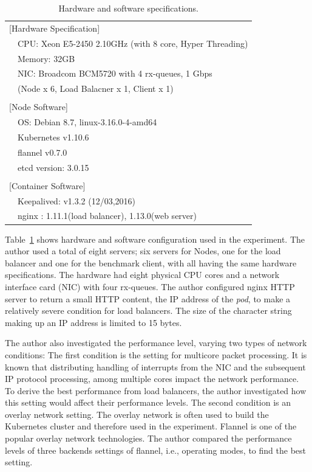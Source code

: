 {
\setlength{\tabcolsep}{3em}
\renewcommand{\arraystretch}{1.1}

\begin{table}[h]
  \centering
  \begin{tabular}{ll}
    \hline 
    \multicolumn{2}{l}{[Hardware Specification]}   \\
    & CPU: Xeon E5-2450 2.10GHz (with 8 core, Hyper Threading) \\
    & Memory: 32GB \\
    & NIC: Broadcom BCM5720 with 4 rx-queues, 1 Gbps \\
    & (Node x 6, Load Balacner x 1, Client x 1) \\
    & \\
    \multicolumn{2}{l}{[Node Software]}  \\
    & OS: Debian 8.7, linux-3.16.0-4-amd64 \\
    & Kubernetes v1.10.6 \\
    & flannel v0.7.0 \\
    & etcd version: 3.0.15 \\
    & \\
    \multicolumn{2}{l}{[Container Software]}   \\
    & Keepalived: v1.3.2 (12/03,2016) \\
    & nginx : 1.11.1(load balancer), 1.13.0(web server) \\
    \hline
  \end{tabular}
  \caption[Hardware and software specifications]{Hardware and software specifications.}
    \label{tab:hw_machine_spec}
\end{table}
}

Table~\ref{tab:hw_machine_spec} shows hardware and software configuration used in the experiment.
The author used a total of eight servers; six servers for Nodes, one for the load balancer and one for the benchmark client, with all having the same hardware specifications.
The hardware had eight physical CPU cores and a network interface card (NIC) with four rx-queues.
The author configured nginx HTTP server to return a small HTTP content, the IP address of the {\em pod}, to make a relatively severe condition for load balancers. 
The size of the character string making up an IP address is limited to 15 bytes.

The author also investigated the performance level, varying two types of network conditions:
The first condition is the setting for multicore packet processing.
It is known that distributing handling of interrupts from the NIC and the subsequent IP protocol processing, among multiple cores impact the network performance.
To derive the best performance from load balancers, the author investigated how this setting would affect their performance levels.
The second condition is an overlay network setting\cite{Sill2016,Marmol2015}.
The overlay network is often used to build the Kubernetes cluster and therefore used in the experiment.
Flannel\cite{CoreOSFlannel} is one of the popular overlay network technologies. 
The author compared the performance levels of three backends settings\cite{CoreOSFlannelBackend} of flannel, i.e., operating modes, to find the best setting.

